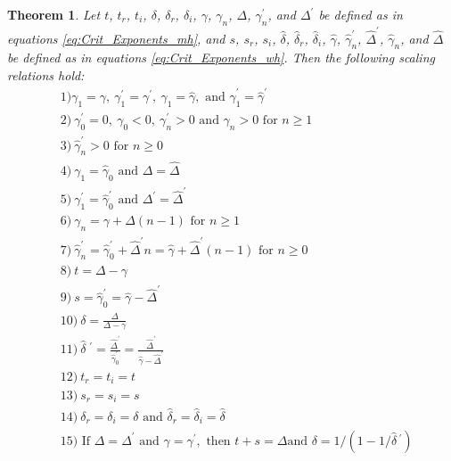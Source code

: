 \documentclass[english,12pt,jmp,graphicx]{revtex4-1}
\newtheorem{theorem}{Theorem}[section]
\newcommand{\gh}{\hat{\gamma}}
\newcommand{\Dh}{\hat{\Delta}}
\newcommand{\dha}{\hat{\delta}}
\begin{document}
\begin{theorem} \label{thm:Crit_Theory_m_w}
  Let $t$, $t_r$, $t_i$, $\delta$, $\delta_r$, $\delta_i$, $\gamma$, $\gamma_n$, $\Delta$, $\gamma_n^\prime$,
  and $\Delta^\prime$ be   defined as in equations \eqref{eq:Crit_Exponents_mh},
  and $s$, $s_r$, $s_i$, $\dha$, $\dha_r$, $\dha_i$, $\gh$, $\gh_n^\prime$,
  $\Dh^\prime$, $\gh_n$, and $\Dh$ be defined as in equations
  \eqref{eq:Crit_Exponents_wh}. Then the following scaling relations
  hold:
%  
  \begin{align*}   
   &1) \gamma_1=\gamma, \ \gamma_1^\prime=\gamma^\prime, \ \gh_1=\gh, \text{ and } \gh_1^\prime=\gh^\prime\\
   &2) \ \gamma_0^\prime=0, \ \gamma_0<0, \ \gamma_n^\prime>0 \text{ and } \gamma_n>0 \text{ for } n\geq1\\
   &3) \ \gh_n^\prime>0 \text{ for } n\geq0\\
   &4) \ \gamma_1=\gh_0 \text{ and } \Delta=\Dh\\
   &5) \ \gamma_1^\prime=\gh_0^\prime \text{ and } \Delta^\prime=\Dh^\prime \\
   &6) \ \gamma_n=\gamma+\Delta(n-1) \text{ for } n\geq1 \\
   &7) \ \gh_n^\prime=\gh_0^\prime+\Dh^\prime n=\gh+\Dh^\prime(n-1) \text{ for } n\geq0 \\
   &8) \ t=\Delta-\gamma \\
   &9) \ s=\gh_0^\prime=\gh-\Dh^\prime \\
   &10) \ \delta=\frac{\Delta}{\Delta-\gamma} \\
   &11) \ \dha\;^\prime=\frac{\Dh^\prime}{\gh_0^\prime}=\frac{\Dh^\prime}{\gh-\Dh^\prime} \\
   &12) \ t_r=t_i=t \\
   &13) \ s_r=s_i=s \\
   &14) \ \delta_r=\delta_i=\delta \text{ and } \dha_r=\dha_i=\dha \\
   &15) \text{ If } \Delta=\Delta^\prime \text{ and } \gamma=\gamma^\prime, \text{ then } t+s=\Delta \text{
     and }  \delta=1/(1-1/\dha\,^\prime)
  \end{align*}
%  
\end{theorem}
%
\end{document}
